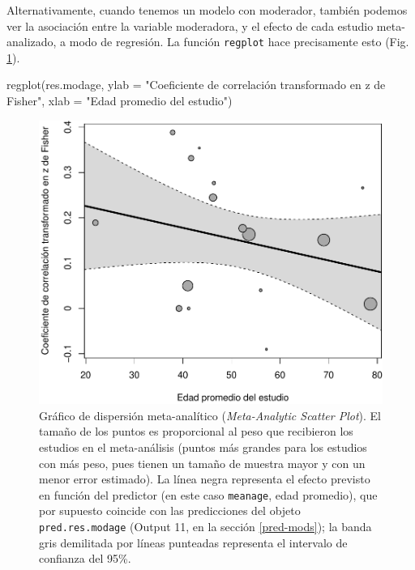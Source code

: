 \documentclass[
  bookmarksnumbered]{article}
\newenvironment{Shaded}{\begin{snugshade}}{\end{snugshade}}
\newcommand{\AttributeTok}[1]{\textcolor[rgb]{0.00,0.34,0.68}{#1}}
\newcommand{\FunctionTok}[1]{\textcolor[rgb]{0.39,0.29,0.61}{#1}}
\newcommand{\NormalTok}[1]{\textcolor[rgb]{0.12,0.11,0.11}{#1}}
\newcommand{\StringTok}[1]{\textcolor[rgb]{0.75,0.01,0.01}{#1}}
\begin{document}
Alternativamente, cuando tenemos un modelo con moderador, también podemos ver la asociación entre la variable moderadora, y el efecto de cada estudio meta-analizado, a modo de regresión. La función \texttt{regplot} hace precisamente esto (Fig. \ref{fig:reg-plot1}).

\begin{Shaded}
\begin{Highlighting}[]
\FunctionTok{regplot}\NormalTok{(res.modage,}
        \AttributeTok{ylab =} \StringTok{"Coeficiente de correlación transformado en z de Fisher"}\NormalTok{,}
        \AttributeTok{xlab =} \StringTok{"Edad promedio del estudio"}\NormalTok{)}
\end{Highlighting}
\end{Shaded}

\begin{figure}
\centering
\includegraphics{Meta-analysis_files/figure-latex/reg-plot1-1.pdf}
\caption{\label{fig:reg-plot1}Gráfico de dispersión meta-analítico (\emph{Meta-Analytic Scatter Plot}). El tamaño de los puntos es proporcional al peso que recibieron los estudios en el meta-análisis (puntos más grandes para los estudios con más peso, pues tienen un tamaño de muestra mayor y con un menor error estimado). La línea negra representa el efecto previsto en función del predictor (en este caso \texttt{meanage}, edad promedio), que por supuesto coincide con las predicciones del objeto \texttt{pred.res.modage} (Output 11, en la sección \ref{pred-mods}); la banda gris demilitada por líneas punteadas representa el intervalo de confianza del 95\%.}
\end{figure}
\end{document}
